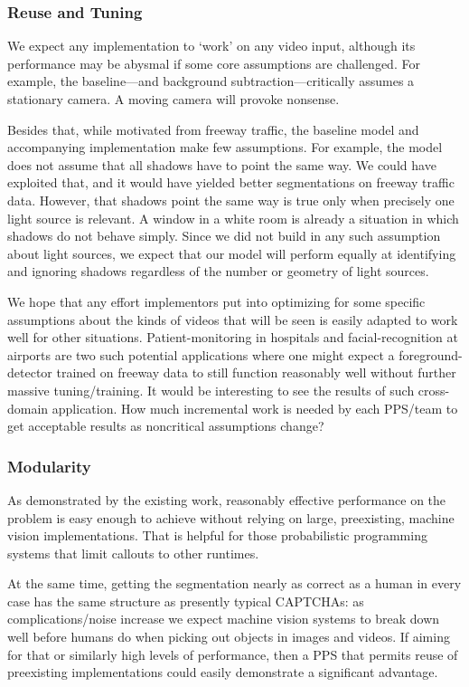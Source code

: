 \subsubsection{Reuse and Tuning}

We expect any implementation to `work' on any video input, although
its performance may be abysmal if some core assumptions are
challenged.  For example, the baseline---and background
subtraction---critically assumes a stationary camera.  A moving camera
will provoke nonsense.

Besides that, while motivated from freeway
traffic, the baseline model and accompanying implementation  make few assumptions.
For example, the model does not assume that all shadows have to point
the same way.  We could have exploited that, and it would have yielded
better segmentations on freeway traffic data.  However, that shadows point the same way is
true only when precisely one light source is relevant.  A window in a
white room is already a situation in which shadows do not behave
simply.  Since we did not build in any such assumption about light
sources, we expect that our model will perform equally at 
identifying and ignoring shadows regardless of the number or geometry of light sources.

We hope that
any effort implementors put into optimizing for some specific
assumptions about the kinds of videos that will be seen is easily
adapted to work well for other situations.  Patient-monitoring in
hospitals and facial-recognition at airports are two such potential applications
where one might expect a foreground-detector trained on freeway data
to still function reasonably well without further massive tuning/training.
It would be interesting to see the results of such cross-domain
application.  How much incremental work is needed by each PPS/team to get
acceptable results as noncritical assumptions change?


\subsubsection{Modularity}

As demonstrated by the existing work, 
reasonably effective performance on the problem is easy enough to
achieve without relying on large, preexisting, machine vision
implementations.  That is helpful for those probabilistic programming
systems that limit callouts to other runtimes.

At the same time, getting the segmentation nearly as correct as a
human in every case has the same structure as presently typical
CAPTCHAs: as complications/noise increase we expect machine vision
systems to break down well before humans do when picking out
objects in images and videos.  If aiming for that or similarly high
levels of performance, then a PPS that permits reuse of
preexisting implementations could easily demonstrate a significant
advantage.


